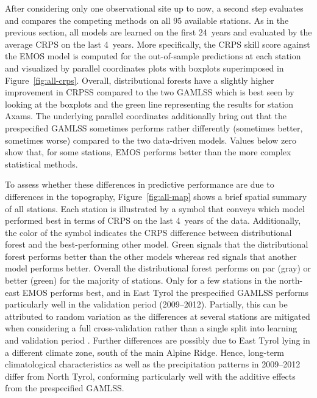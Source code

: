 \documentclass[aoas, preprint]{imsart}
\numberwithin{equation}{subsection}
\begin{document}
After considering only one observational site up to now, a second step
evaluates and compares the competing methods on all 95 available stations. As in the previous
section, all models are learned on the first 24~years and evaluated by the
average CRPS on the last 4~years. More specifically, the CRPS skill score
against the EMOS model is computed for the out-of-sample predictions at each
station and visualized by parallel coordinates plots with boxplots superimposed
in Figure~\ref{fig:all-crps}. Overall, distributional forests have a slightly
higher improvement in CRPSS compared to the two GAMLSS which is best seen
by looking at the boxplots and the green line representing the results
for station Axams. The underlying parallel coordinates additionally
bring out that the prespecified GAMLSS sometimes performs rather differently
(sometimes better, sometimes worse) compared to the two data-driven models.
Values below zero show that, for some stations, EMOS performs better
than the more complex statistical methods.

To assess whether these differences in predictive performance are due to differences
in the topography, Figure~\ref{fig:all-map} shows a brief spatial summary of all
stations. Each station is illustrated by a symbol that conveys which
model performed best in terms of CRPS on the last 4~years of the data.
Additionally, the color of the symbol indicates the CRPS difference between 
distributional forest and the best-performing other model. Green signals that
the distributional forest performs better than the other models whereas red
signals that another model performs better. Overall the distributional forest
performs on par (gray) or better (green) for the majority of stations. Only
for a few stations in the north-east EMOS performs best, and in East Tyrol
the prespecified GAMLSS performs particularly well in the validation period
(2009--2012). Partially, this can be attributed to random variation as
the differences at several stations are mitigated when considering a full
cross-validation rather than a single split into learning and validation period
\citep[see Supplement~B,][and the corresponding discussion in the next section]{Schlosser+Hothorn+Stauffer:2019b}.
Further differences are possibly due to East Tyrol lying in a different
climate zone, south of the main Alpine Ridge. Hence, long-term climatological
characteristics as well as the precipitation patterns in 2009--2012 differ
from North Tyrol, conforming particularly well with the additive effects from
the prespecified GAMLSS.
\end{document}
